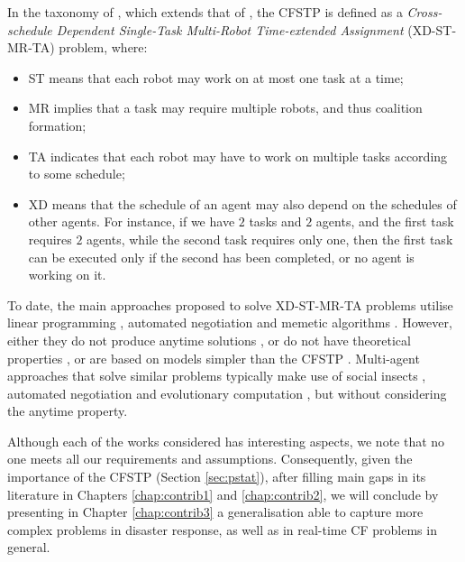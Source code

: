 In the taxonomy of \cite{korsah2013taxonomy}, which extends that of
\cite{gerkey2004}, the CFSTP is defined as a \emph{Cross-schedule Dependent Single-Task
Multi-Robot Time-extended Assignment} (XD-ST-MR-TA) problem, where:
\begin{itemize}
    \item ST means that each robot may work on at most one task at a time;
    \item MR implies that a task may require multiple robots, and thus coalition
        formation;
    \item TA indicates that each robot may have to work on multiple tasks according to
        some schedule;
    \item XD means that the schedule of an agent may also depend on the schedules of other
        agents. For instance, if we have $2$ tasks and $2$ agents, and the first task
        requires $2$ agents, while the second task requires only one, then the
        first task can be executed only if the second has been completed, or no agent is
        working on it.
\end{itemize}
To date, the main approaches proposed to solve XD-ST-MR-TA problems utilise linear
programming \cite{bogner2018,koes2005,korsah2011thesis}, automated negotiation
\cite{krizmancic2020} and memetic algorithms \cite{liu2015}. However, either they do not
produce anytime solutions \cite{krizmancic2020,liu2015}, or do not have theoretical
properties \cite{bogner2018}, or are based on models simpler than the CFSTP
\cite{koes2005,korsah2011thesis}.
Multi-agent approaches that solve similar problems typically make use of social insects
\cite{dos2011,ferreira2010,ferreira2007,schwarzrock2018,amorim2020}, automated negotiation
\cite{gallud2018,godoy2013,ye2013,nelke2020,tkach2021} and evolutionary computation
\cite{zhou2020}, but without considering the anytime property.

Although each of the works considered has interesting aspects, we note that no one meets
all our requirements and assumptions. Consequently, given the importance of the CFSTP
(Section \ref{sec:pstat}), after filling main gaps in its literature in Chapters
\ref{chap:contrib1} and \ref{chap:contrib2}, we will conclude by presenting in Chapter
\ref{chap:contrib3} a generalisation able to capture more complex problems in disaster
response, as well as in real-time CF problems in general.

